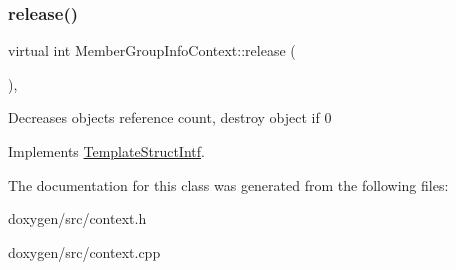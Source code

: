 \mbox{\label{class_member_group_info_context_a9d31265654c2e5444af3a5fe1a54da46}} 
\subsubsection{\texorpdfstring{release()}{release()}}
{\footnotesize\ttfamily virtual int Member\+Group\+Info\+Context\+::release (\begin{DoxyParamCaption}{ }\end{DoxyParamCaption})\hspace{0.3cm}{\ttfamily [inline]}, {\ttfamily [virtual]}}

Decreases object\textquotesingle{}s reference count, destroy object if 0 

Implements \mbox{\hyperlink{class_template_struct_intf_a3dce7dd29d3f66a8080b40578e8a5045}{Template\+Struct\+Intf}}.



The documentation for this class was generated from the following files\+:\begin{DoxyCompactItemize}
\item 
doxygen/src/context.\+h\item 
doxygen/src/context.\+cpp\end{DoxyCompactItemize}
